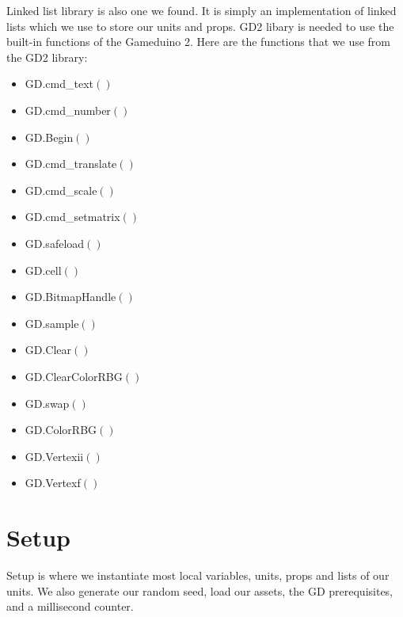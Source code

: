 Linked list library is also one we found. It is simply an implementation of linked lists which we use to store our units and props.
\newline
GD2 libary is needed to use the built-in functions of the Gameduino 2.
Here are the functions that we use from the GD2 library:
\begin{multicols}{3}
\begin{itemize}
    \item GD.cmd\_text$()$
    \item GD.cmd\_number$()$
    \item GD.Begin$()$
    \item GD.cmd\_translate$()$
    \item GD.cmd\_scale$()$
    \item GD.cmd\_setmatrix$()$
    \item GD.safeload$()$
    \item GD.cell$()$
    \item GD.BitmapHandle$()$
    \item GD.sample$()$
    \item GD.Clear$()$
    \item GD.ClearColorRBG$()$
    \item GD.swap$()$
    \item GD.ColorRBG$()$
    \item GD.Vertexii$()$
    \item GD.Vertexf$()$
\end{itemize}
\end{multicols}


\section{Setup}
Setup is where we instantiate most local variables, units, props and lists of our units. We also generate our random seed, load our assets, the GD prerequisites, and a millisecond counter.

